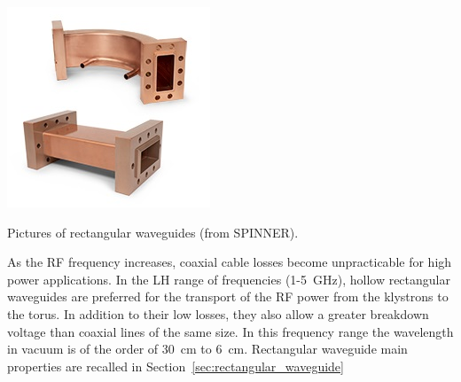 \begin{marginfigure}
	\centering
	\includegraphics[width=1.0\linewidth]{figures/chap1/SPINNER_Rectangular_waveguide}
	\caption{Pictures of rectangular waveguides (from SPINNER).}
	\label{fig:spinnerrectangularwaveguide}
\end{marginfigure}

As the RF frequency increases, coaxial cable losses become unpracticable for high power applications. In the LH range of frequencies (1-5~\si{GHz}), hollow rectangular waveguides are preferred for the transport of the RF power from the klystrons to the torus. In addition to their low losses, they also allow a greater breakdown voltage than coaxial lines of the same size. In this frequency range the wavelength in vacuum is of the order of 30~\si{cm} to 6~\si{cm}. Rectangular waveguide main properties are recalled in Section~\ref{sec:rectangular_waveguide}

